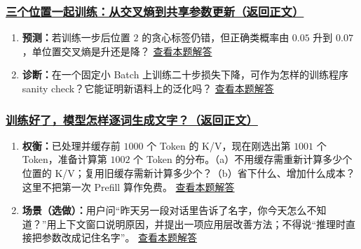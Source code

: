 \subsubsection*{\hyperref[check:22c-language-training]{三个位置一起训练：从交叉熵到共享参数更新（返回正文）}}\begin{enumerate}[label={},leftmargin=4.8em,itemsep=4pt]
\item[\textbf{C4-28.}] \label{exercise:C4-28}\label{extension:22c-language-training:4}\textbf{预测：}若训练一步后位置 $2$ 的贪心标签仍错，但正确类概率由 $0.05$ 升到 $0.07$，单位置交叉熵是升还是降？ \hyperref[answerpiece:22c-language-training:4]{查看本题解答}
\item[\textbf{C4-29.}] \label{exercise:C4-29}\label{extension:22c-language-training:5}\textbf{诊断：}在一个固定小 Batch 上训练二十步损失下降，可作为怎样的训练程序 sanity check？它能证明新语料上的泛化吗？ \hyperref[answerpiece:22c-language-training:5]{查看本题解答}
\end{enumerate}

\subsubsection*{\hyperref[check:23-llm-systems]{训练好了，模型怎样逐词生成文字？（返回正文）}}\begin{enumerate}[label={},leftmargin=4.8em,itemsep=4pt]
\item[\textbf{C4-30.}] \label{exercise:C4-30}\label{extension:23-llm-systems:4}\textbf{权衡：}已处理并缓存前 $1000$ 个 Token 的 K/V，现在刚选出第 $1001$ 个 Token，准备计算第 $1002$ 个 Token 的分布。（a）不用缓存需重新计算多少个位置的 K/V；复用旧缓存需新计算多少个？（b）省下什么、增加什么成本？这里不把第一次 Prefill 算作免费。 \hyperref[answerpiece:23-llm-systems:4]{查看本题解答}
\item[\textbf{C4-31.}] \label{exercise:C4-31}\label{extension:23-llm-systems:5}\textbf{场景（选做）：}用户问“昨天另一段对话里告诉了名字，你今天怎么不知道？”用上下文窗口说明原因，并提出一项应用层改善方法；不得说“推理时直接把参数改成记住名字”。 \hyperref[answerpiece:23-llm-systems:5]{查看本题解答}
\end{enumerate}

